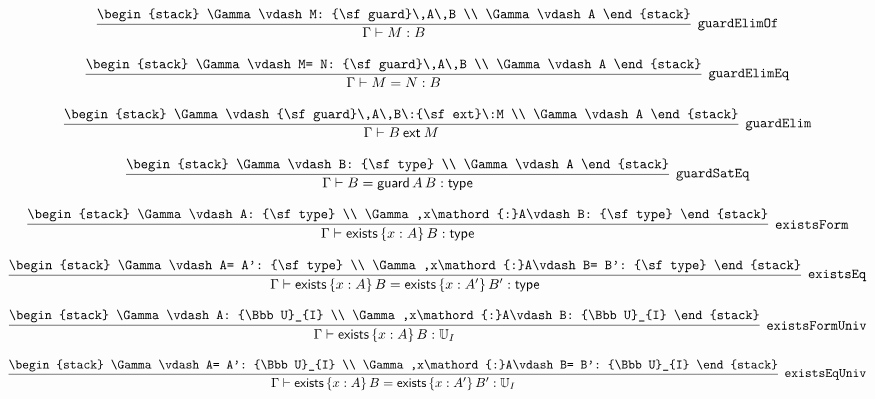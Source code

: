 \[
\infer[{\tt guardElimOf}]{\Gamma \vdash M: B}{
\begin{stack}
\Gamma \vdash M: {\sf guard}\,A\,B
\\
\Gamma \vdash A
\end{stack}}
\]

\[
\infer[{\tt guardElimEq}]{\Gamma \vdash M= N: B}{
\begin{stack}
\Gamma \vdash M= N: {\sf guard}\,A\,B
\\
\Gamma \vdash A
\end{stack}}
\]

\[
\infer[{\tt guardElim}]{\Gamma \vdash B\:{\sf ext}\:M}{
\begin{stack}
\Gamma \vdash {\sf guard}\,A\,B\:{\sf ext}\:M
\\
\Gamma \vdash A
\end{stack}}
\]

\[
\infer[{\tt guardSatEq}]{\Gamma \vdash B= {\sf guard}\,A\,B: {\sf type}}{
\begin{stack}
\Gamma \vdash B: {\sf type}
\\
\Gamma \vdash A
\end{stack}}
\]

\[
\infer[{\tt existsForm}]{\Gamma \vdash {\sf exists}\,\{x : A\}\,B: {\sf type}}{
\begin{stack}
\Gamma \vdash A: {\sf type}
\\
\Gamma ,x\mathord{:}A\vdash B: {\sf type}
\end{stack}}
\]

\[
\infer[{\tt existsEq}]{\Gamma \vdash {\sf exists}\,\{x : A\}\,B= {\sf exists}\,\{x : A'\}\,B': {\sf type}}{
\begin{stack}
\Gamma \vdash A= A': {\sf type}
\\
\Gamma ,x\mathord{:}A\vdash B= B': {\sf type}
\end{stack}}
\]

\[
\infer[{\tt existsFormUniv}]{\Gamma \vdash {\sf exists}\,\{x : A\}\,B: {\Bbb U}_{I}}{
\begin{stack}
\Gamma \vdash A: {\Bbb U}_{I}
\\
\Gamma ,x\mathord{:}A\vdash B: {\Bbb U}_{I}
\end{stack}}
\]

\[
\infer[{\tt existsEqUniv}]{\Gamma \vdash {\sf exists}\,\{x : A\}\,B= {\sf exists}\,\{x : A'\}\,B': {\Bbb U}_{I}}{
\begin{stack}
\Gamma \vdash A= A': {\Bbb U}_{I}
\\
\Gamma ,x\mathord{:}A\vdash B= B': {\Bbb U}_{I}
\end{stack}}
\]

